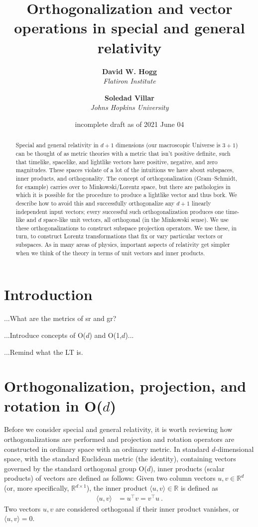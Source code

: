 \documentclass{article}
\title{\bfseries Orthogonalization and vector operations in special and general relativity}
\author{\textbf{David W. Hogg}\\
        \textsl{Flatiron Institute}\\
        \and
        \textbf{Soledad Villar}\\
        \textsl{Johns Hopkins University}}
\date{incomplete draft as of 2021 June 04}
\newcommand{\inner}[2]{\langle{#1},{#2}\rangle}
\begin{document}
\thispagestyle{plain}
\maketitle

\begin{abstract}\noindent
    Special and general relativity in $d+1$ dimensions (our macroscopic Universe is $3+1$) can be thought of as metric theories with a metric that isn't positive definite, such that timelike, spacelike, and lightlike vectors have positive, negative, and zero magnitudes.
    These spaces violate of a lot of the intuitions we have about subspaces, inner products, and orthogonality.
    The concept of orthogonalization (Gram--Schmidt, for example) carries over to Minkowski/Lorentz space, but there are pathologies in which it is possible for the procedure to produce a lightlike vector and thus bork.
    We describe how to avoid this and successfully orthogonalize any $d+1$ linearly independent input vectors; every successful such orthogonalization produces one time-like and $d$ space-like unit vectors, all orthogonal (in the Minkowski sense).
    We use these orthogonalizations to construct subspace projection operators.
    We use these, in turn, to construct Lorentz transformations that fix or vary particular vectors or subspaces.
    As in many areas of physics, important aspects of relativity get simpler when we think of the theory in terms of unit vectors and inner products.
\end{abstract}

\section{Introduction}

...What are the metrics of sr and gr?

...Introduce concepts of O($d$) and O(1,$d$)...

...Remind what the LT is.

\section{Orthogonalization, projection, and rotation in O($d$)}

Before we consider special and general relativity, it is worth reviewing how orthogonalizations are performed and projection and rotation operators are constructed in ordinary space with an ordinary metric.
In standard $d$-dimensional space, with the standard Euclidean metric (the identity), containing vectors governed by the standard orthogonal group O($d$), inner products (scalar products) of vectors are defined as follows:
Given two column vectors $u,v\in\mathbb{R}^d$ (or, more specifically, $\mathbb{R}^{d\times1}$), the inner product $\inner{u}{v}\in\mathbb{R}$ is defined as
\begin{align}
    \inner{u}{v} &= u^\top v = v^\top u ~.
\end{align}
Two vectors $u,v$ are considered orthogonal if their inner product vanishes, or $\inner{u}{v}=0$.
\end{document}
